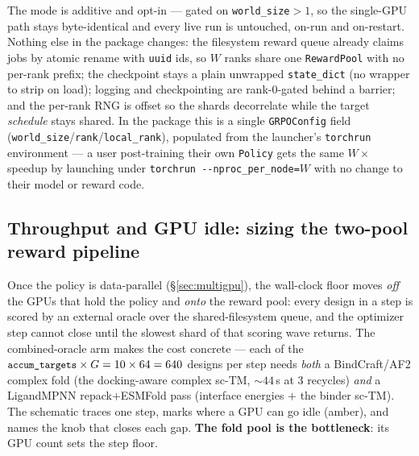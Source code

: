\documentclass[11pt]{article}
\newcommand{\ttk}[1]{\texttt{\small #1}}
\begin{document}
The mode is additive and opt-in --- gated on \ttk{world\_size}$>1$, so the single-GPU path stays
byte-identical and every live run is untouched, on-run and on-restart. Nothing else in the package
changes: the filesystem reward queue already claims jobs by atomic rename with \ttk{uuid} ids, so $W$
ranks share one \ttk{RewardPool} with no per-rank prefix; the checkpoint stays a plain unwrapped
\ttk{state\_dict} (no wrapper to strip on load); logging and checkpointing are rank-$0$-gated behind a
barrier; and the per-rank RNG is offset so the shards decorrelate while the target \emph{schedule}
stays shared. In the package this is a single \ttk{GRPOConfig} field
(\ttk{world\_size}/\ttk{rank}/\ttk{local\_rank}), populated from the launcher's \ttk{torchrun}
environment --- a user post-training their own \ttk{Policy} gets the same $W\times$ speedup by
launching under \ttk{torchrun -\/-nproc\_per\_node=$W$} with no change to their model or reward code.

\subsection{Throughput and GPU idle: sizing the two-pool reward pipeline}
\label{sec:throughput}
Once the policy is data-parallel (\S\ref{sec:multigpu}), the wall-clock floor moves \emph{off} the
GPUs that hold the policy and \emph{onto} the reward pool: every design in a step is scored by an
external oracle over the shared-filesystem queue, and the optimizer step cannot close until the
slowest shard of that scoring wave returns. The combined-oracle arm makes the cost concrete --- each
of the $\ttk{accum\_targets}\times G = 10\times64 = 640$ designs per step needs \emph{both} a
BindCraft/AF2 complex fold (the docking-aware complex sc-TM, $\sim\!44$\,s at $3$ recycles) \emph{and}
a LigandMPNN repack$+$ESMFold pass (interface energies $+$ the binder sc-TM). The schematic traces one
step, marks where a GPU can go idle (\textcolor{bLine}{amber}), and names the knob that closes each
gap. \textbf{The fold pool is the bottleneck}: its GPU count sets the step floor.
\end{document}
